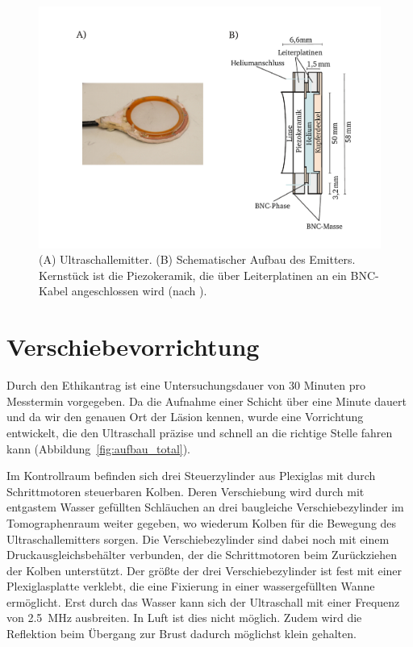 \documentclass[
    11pt,
    ngerman
]{scrbook}
\begin{document}
\begin{figure}
    \centering
    \includegraphics[width=.8\textwidth]{Abbildungen/emitter.pdf}
    \caption{(A) Ultraschallemitter. (B) Schematischer Aufbau des Emitters. Kernstück ist die Piezokeramik, die über Leiterplatinen an ein BNC-Kabel angeschlossen wird (nach \parencite{dipl_ulucay}).}
    \label{fig:emitter}
\end{figure}

\section{Verschiebevorrichtung}

Durch den Ethikantrag ist eine Untersuchungsdauer von 30 Minuten pro Messtermin
vorgegeben. Da die Aufnahme einer Schicht über eine Minute dauert und da wir
den genauen Ort der Läsion kennen, wurde eine Vorrichtung entwickelt, die den
Ultraschall präzise und schnell an die richtige Stelle fahren kann
(Abbildung~\ref{fig:aufbau_total}).

Im Kontrollraum befinden sich drei Steuerzylinder aus Plexiglas mit durch
Schrittmotoren steuerbaren Kolben. Deren Verschiebung wird durch mit
entgastem Wasser gefüllten Schläuchen an drei baugleiche Verschiebezylinder im
Tomographenraum weiter gegeben, wo wiederum Kolben für die Bewegung des
Ultraschallemitters sorgen. Die Verschiebezylinder sind dabei noch mit einem
Druckausgleichsbehälter verbunden, der die Schrittmotoren beim Zurückziehen der
Kolben unterstützt. Der größte der drei Verschiebezylinder ist fest mit einer
Plexiglasplatte verklebt, die eine Fixierung in einer wassergefüllten Wanne
ermöglicht. Erst durch das Wasser kann sich der Ultraschall mit einer Frequenz
von \SI{2.5}{\mega\hertz} ausbreiten. In Luft ist dies nicht möglich. Zudem
wird die Reflektion beim Übergang zur Brust dadurch möglichst klein gehalten.
\end{document}
